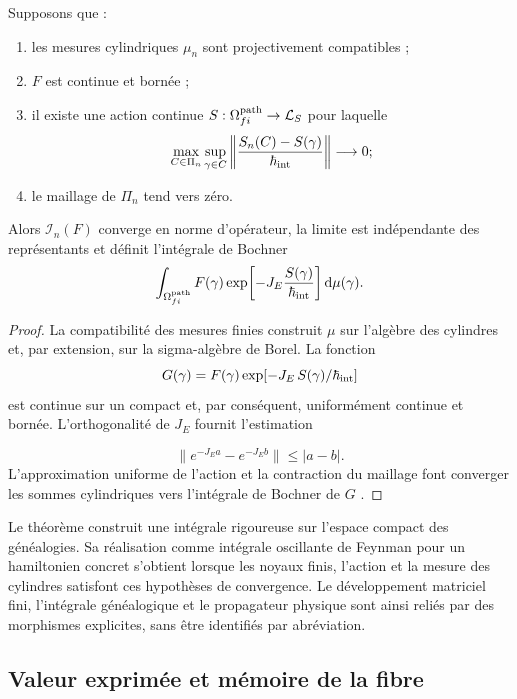 \begin{theorem}
\label{thm:integral-genealogica-caminos-rev2}
Supposons que :
\begin{enumerate}
 \item les mesures cylindriques \(\mu_n\) sont projectivement compatibles ;
 \item \(F\) est continue et bornée ;
 \item il existe une action continue \(S:\Omega^{\rm path}_{fi}\to\mathcal L_S\) pour laquelle
 \[
  \max_{C\in\Pi_n}\sup_{\gamma\in C}
  \left\|\frac{S_n(C)-S(\gamma)}{\hbar_{\rm int}}\right\|
  \longrightarrow0;
 \]
 \item le maillage de \(\Pi_n\) tend vers zéro.
\end{enumerate}
Alors \(\mathcal I_n(F)\) converge en norme d’opérateur, la limite est
indépendante des représentants et définit l’intégrale de Bochner
\begin{equation}
 \int_{\Omega^{\rm path}_{fi}}
 F(\gamma)
 \exp\!\left[-J_E\frac{S(\gamma)}{\hbar_{\rm int}}\right]
 \mathrm d\mu(\gamma).
 \label{eq:integral-genealogica-caminos-rev2}
\end{equation}
\end{theorem}

\begin{proof}
La compatibilité des mesures finies construit \(\mu\) sur l'algèbre des cylindres et, par extension, sur la sigma-algèbre de Borel. La fonction
\[
 G(\gamma)=F(\gamma)
 \exp[-J_E\,S(\gamma)/\hbar_{\rm int}]
\]
est continue sur un compact et, par conséquent, uniformément continue et
bornée. L’orthogonalité de \(J_E\) fournit l’estimation

\[
 \|e^{-J_E a}-e^{-J_E b}\|\leq |a-b|.
\]
L’approximation uniforme de l’action et la contraction du maillage font
converger les sommes cylindriques vers l’intégrale de Bochner de \(G\)
\cite{Bochner1955}.
\end{proof}

Le théorème construit une intégrale rigoureuse sur l’espace compact des
généalogies. Sa réalisation comme intégrale oscillante de Feynman pour un
hamiltonien concret s’obtient lorsque les noyaux finis, l’action et la
mesure des cylindres satisfont ces hypothèses de convergence. Le développement
matriciel fini, l’intégrale généalogique et le propagateur physique sont ainsi
reliés par des morphismes explicites, sans être identifiés par abréviation.


\subsection{Valeur exprimée et mémoire de la fibre}


